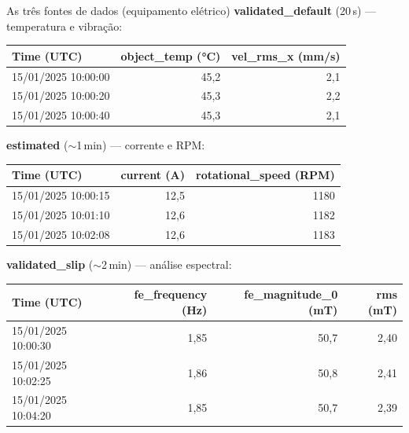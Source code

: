 \documentclass{beamer}
\begin{document}
\begin{frame}{As três fontes de dados (equipamento elétrico)}
    \footnotesize
    \textbf{validated\_default} (20\,s) --- temperatura e vibração:

    \begin{tabular}{lrr}
        \hline
        \textbf{Time (UTC)} & \textbf{object\_temp (°C)} & \textbf{vel\_rms\_x (mm/s)} \\
        \hline
        15/01/2025 10:00:00 & 45,2 & 2,1 \\
        15/01/2025 10:00:20 & 45,3 & 2,2 \\
        15/01/2025 10:00:40 & 45,3 & 2,1 \\
        \hline
    \end{tabular}

    \vspace{0.25cm}
    \textbf{estimated} ($\sim$1\,min) --- corrente e RPM:

    \begin{tabular}{lrr}
        \hline
        \textbf{Time (UTC)} & \textbf{current (A)} & \textbf{rotational\_speed (RPM)} \\
        \hline
        15/01/2025 10:00:15 & 12,5 & 1180 \\
        15/01/2025 10:01:10 & 12,6 & 1182 \\
        15/01/2025 10:02:08 & 12,6 & 1183 \\
        \hline
    \end{tabular}

    \vspace{0.25cm}
    \textbf{validated\_slip} ($\sim$2\,min) --- análise espectral:

    \begin{tabular}{lrrr}
        \hline
        \textbf{Time (UTC)} & \textbf{fe\_frequency (Hz)} & \textbf{fe\_magnitude\_0 (mT)} & \textbf{rms (mT)} \\
        \hline
        15/01/2025 10:00:30 & 1,85 & 50,7 & 2,40 \\
        15/01/2025 10:02:25 & 1,86 & 50,8 & 2,41 \\
        15/01/2025 10:04:20 & 1,85 & 50,7 & 2,39 \\
        \hline
    \end{tabular}
\end{frame}
\end{document}
